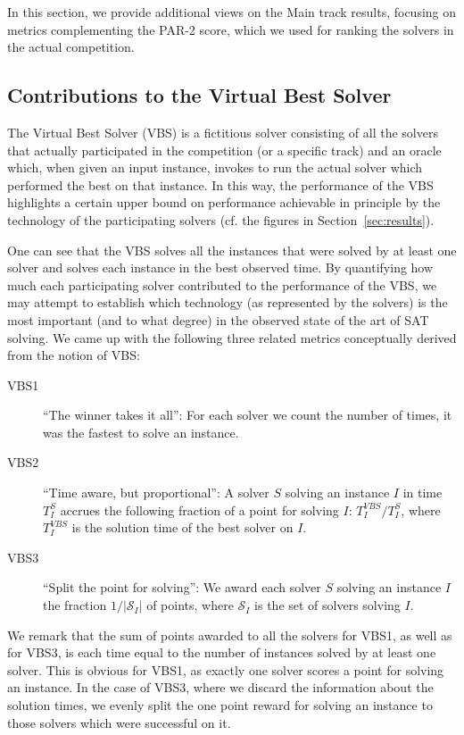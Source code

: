 \documentclass{elsarticle}
\begin{document}
In this section, we provide additional views on the Main track results,
focusing on metrics complementing the PAR-2 score, 
which we used for ranking the solvers in the actual competition.

\subsection{Contributions to the Virtual Best Solver}

The Virtual Best Solver (VBS) is a fictitious solver consisting 
of all the solvers that actually participated in the competition (or a specific track)
and an oracle which, when given an input instance,
invokes to run the actual solver which performed the best on that instance.
In this way, the performance of the VBS highlights a certain upper bound 
on performance achievable in principle by the technology 
of the participating solvers (cf. the figures in Section~\ref{sec:results}). 

One can see that the VBS solves all the instances that
were solved by at least one solver and solves each instance in the best observed time.
By quantifying how much each participating solver contributed 
to the performance of the VBS, we may attempt to establish which
technology (as represented by the solvers) is the most important
(and to what degree) in the observed state of the art of SAT solving.
We came up with the following three related metrics conceptually derived
from the notion of VBS:
\begin{description}
\item[VBS1]
``The winner takes it all'':
For each solver we count the number of times, it was the fastest to solve an instance.
\item[VBS2]
``Time aware, but proportional'':
A solver $S$ solving an instance $I$ in time $T^S_I$ accrues 
the following fraction of a point for solving $I$:
$T^\mathit{VBS}_I/T^S_I$, where $T^\mathit{VBS}_I$ is the solution time of the best solver on $I$.
\item[VBS3]
``Split the point for solving'':
We award each solver $S$ solving an instance $I$ the fraction $1/|\mathcal{S}_I|$ of points, where
$\mathcal{S}_I$ is the set of solvers solving $I$.
\end{description}
We remark that the sum of points awarded to all the solvers for VBS1, as well as for VBS3,
is each time equal to the number of instances solved by at least one solver.
This is obvious for VBS1, as exactly one solver scores a point for solving an instance.
In the case of VBS3, where we discard the information about the solution times, 
we evenly split the one point reward for solving an instance to those solvers which were successful on it.
\end{document}
